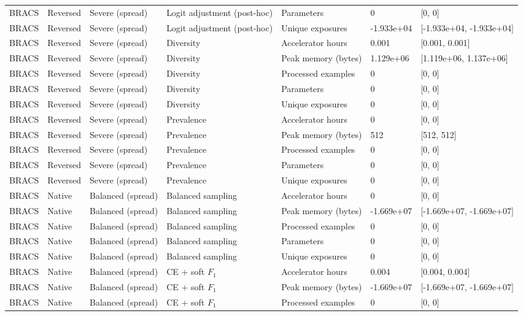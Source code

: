 \begin{longtable}{lllllll}
BRACS & Reversed & Severe (spread) & Logit adjustment (post-hoc) & Parameters & 0 & [0, 0] \\
BRACS & Reversed & Severe (spread) & Logit adjustment (post-hoc) & Unique exposures & -1.933e+04 & [-1.933e+04, -1.933e+04] \\
BRACS & Reversed & Severe (spread) & Diversity & Accelerator hours & 0.001 & [0.001, 0.001] \\
BRACS & Reversed & Severe (spread) & Diversity & Peak memory (bytes) & 1.129e+06 & [1.119e+06, 1.137e+06] \\
BRACS & Reversed & Severe (spread) & Diversity & Processed examples & 0 & [0, 0] \\
BRACS & Reversed & Severe (spread) & Diversity & Parameters & 0 & [0, 0] \\
BRACS & Reversed & Severe (spread) & Diversity & Unique exposures & 0 & [0, 0] \\
BRACS & Reversed & Severe (spread) & Prevalence & Accelerator hours & 0 & [0, 0] \\
BRACS & Reversed & Severe (spread) & Prevalence & Peak memory (bytes) & 512 & [512, 512] \\
BRACS & Reversed & Severe (spread) & Prevalence & Processed examples & 0 & [0, 0] \\
BRACS & Reversed & Severe (spread) & Prevalence & Parameters & 0 & [0, 0] \\
BRACS & Reversed & Severe (spread) & Prevalence & Unique exposures & 0 & [0, 0] \\
BRACS & Native & Balanced (spread) & Balanced sampling & Accelerator hours & 0 & [0, 0] \\
BRACS & Native & Balanced (spread) & Balanced sampling & Peak memory (bytes) & -1.669e+07 & [-1.669e+07, -1.669e+07] \\
BRACS & Native & Balanced (spread) & Balanced sampling & Processed examples & 0 & [0, 0] \\
BRACS & Native & Balanced (spread) & Balanced sampling & Parameters & 0 & [0, 0] \\
BRACS & Native & Balanced (spread) & Balanced sampling & Unique exposures & 0 & [0, 0] \\
BRACS & Native & Balanced (spread) & CE + soft $F_1$ & Accelerator hours & 0.004 & [0.004, 0.004] \\
BRACS & Native & Balanced (spread) & CE + soft $F_1$ & Peak memory (bytes) & -1.669e+07 & [-1.669e+07, -1.669e+07] \\
BRACS & Native & Balanced (spread) & CE + soft $F_1$ & Processed examples & 0 & [0, 0] \\

\end{longtable}

